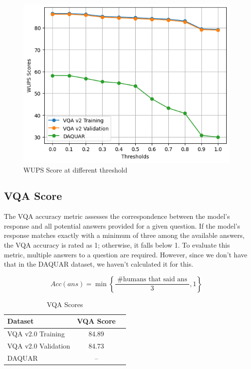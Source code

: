 \begin{figure}[htbp]
  \centering
   \includegraphics[width=0.75\linewidth]{sec/Images/image7.png}
   \caption{WUPS Score at different threshold}
   \label{fig:onecol}
\end{figure}

\subsection{VQA Score}
The VQA accuracy metric assesses the correspondence between the model's response and all potential answers provided for a given question. If the model's response matches exactly with a minimum of three among the available answers, the VQA accuracy is rated as 1; otherwise, it falls below 1. To evaluate this metric, multiple answers to a question are required. However, since we don't have that in the DAQUAR dataset, we haven't calculated it for this.


\[Acc(ans)=\min \left\{\frac{\text { \#humans that said ans }}{3}, 1\right\}\]

\begin{table}[h]
\centering
\begin{tabular}{@{}lcc@{}}
\toprule
Dataset & VQA Score\\
\midrule
VQA v2.0 Training &
84.89
\\
VQA v2.0 Validation&
84.73
\\
DAQUAR &
--
\\
\bottomrule
\end{tabular}
\caption{VQA Scores}
\label{tab:example}
\end{table}


